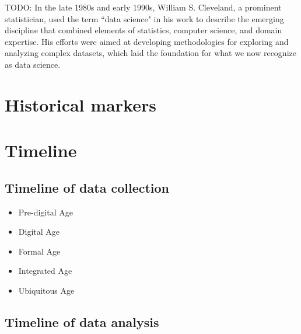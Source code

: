 TODO:
In the late 1980s and early 1990s, William S. Cleveland, a prominent statistician, used
the term ``data science" in his work to describe the emerging discipline that combined
elements of statistics, computer science, and domain expertise. His efforts were aimed at
developing methodologies for exploring and analyzing complex datasets, which laid the
foundation for what we now recognize as data science.

\section{Historical markers}

\section{Timeline}

\subsection{Timeline of data collection}

\begin{itemize}
  \item Pre-digital Age
  \item Digital Age
  \item Formal Age
  \item Integrated Age
  \item Ubiquitous Age
\end{itemize}

\subsection{Timeline of data analysis}
